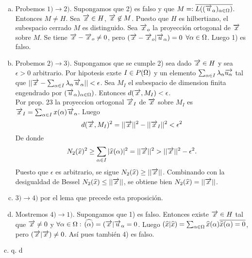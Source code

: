 \begin{enumerate}[a)]
\item Probemos $1) \to 2)$. Supongamos que 2) es falso y que $M=:\overline{L ( (\overrightarrow{u}_\alpha)_{\alpha \in \Omega})}$. Entonces $M \neq H$. Sea $\overrightarrow{x} \in H$, $\overrightarrow{x} \not \in M$. Puesto que $H$ es hilbertiano, el subespacio cerrado $M$ es distinguido. Sea $\overrightarrow{x}_o$ la proyección ortogonal de $\overrightarrow{x}$ sobre $M$. Se tiene $\overrightarrow{x} - \overrightarrow{x}_o \neq 0$, pero $(\overrightarrow{x}-\overrightarrow{x}_o | \overrightarrow{u}_\alpha)=0$ $\forall \alpha \in \Omega$. Luego 1) es falso.

\item Probemos $2) \to 3)$. Supongamos que se cumple 2) sea dado $\overrightarrow{x} \in H$ y sea $\epsilon >0$ arbitrario. Por hipotesis exste $I \in P (\Omega)$ y un elemento $\sum_{\alpha \in I} \lambda _\alpha \overrightarrow{u_\alpha}$ tal que $|| \overrightarrow{x} - \sum_{\alpha \in I} \lambda_\alpha \overrightarrow{u}_\alpha || < \epsilon$. Sea $M_I$ el subespacio de dimension finita engendrado por $(\overrightarrow{u}_\alpha)_{\alpha \in \Omega})$. Entonces $d(\overrightarrow{x} ,M_I) < \epsilon$. \\
Por prop. 23 la proyeccion ortogonal $\overrightarrow{x}_I$ de $\overrightarrow{x}$ sobre $M_I$ es $\overrightarrow{x}_I=\sum_{\alpha \in I} x(\alpha) \overrightarrow{u}_\alpha$. Luego
$$
d(\overrightarrow{x},M_I)^2=|| \overrightarrow{x} ||^2 - || \overrightarrow{x}_I ||^2 < \epsilon^2
$$
De donde 
$$
N_2(\widehat{x})^2 \geq \sum_{\alpha \in I}| \widehat{x}(\alpha)|^2=||\overrightarrow{x} ||^2>|| \overrightarrow{x} ||^2-\epsilon^2.
$$
Puesto que $\epsilon$ es arbitrario, se sigue $N_2(\widehat{x}) \geq || \overrightarrow{x} ||$. Combinando con la desigualdad de Bessel $N_2(\widehat{x}) \leq || \overrightarrow{x} ||$, se obtiene bien $N_2(\widehat{x})=|| \overrightarrow{x} ||$.
\item $3) \to 4)$ por el lema que precede esta proposición. 
\item Mostremos $4)\to 1)$. Supongamos que 1) es falso. Entonces existe $\overrightarrow{x} \in H$ tal que $\overrightarrow{x} \neq 0$ y $\forall \alpha \in \Omega:$ $\widehat{(\alpha)}=(\overrightarrow{x} | \overrightarrow{u}_{\alpha}=0$. Luego $(\widehat{x} | \widehat{x})= \sum_{\alpha \in \Omega} \widehat{x}(\alpha) \overline{\widehat{x}(\alpha)=0}$, pero $(\overrightarrow{x} | \overrightarrow{x}) \neq 0$. Así pues también 4) es falso. 
\end{enumerate}
 \phantom{sssssssssssssssssssssssssssssssssss sasdasdasdasdadadssada} c. q. d \\ \\
 
